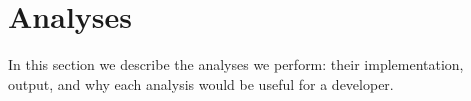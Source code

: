 \section{Analyses}

In this section we describe the analyses we perform: their implementation,
output, and why each analysis would be useful for a developer.








